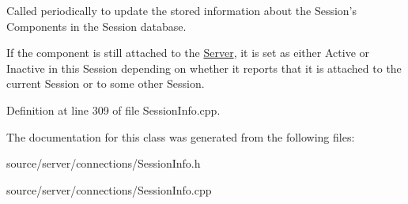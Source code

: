 Called periodically to update the stored information about the Session's Components in the Session database. 

If the component is still attached to the \hyperlink{class_server}{Server}, it is set as either Active or Inactive in this Session depending on whether it reports that it is attached to the current Session or to some other Session. 

Definition at line 309 of file Session\-Info.\-cpp.



The documentation for this class was generated from the following files\-:\begin{DoxyCompactItemize}
\item 
source/server/connections/Session\-Info.\-h\item 
source/server/connections/Session\-Info.\-cpp\end{DoxyCompactItemize}
